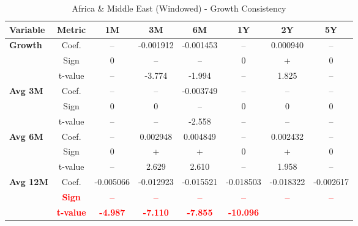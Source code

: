 \documentclass[11pt,english,a4paper,hidelinks]{book}
\begin{document}
\begin{table}[H]
    \centering
    \caption{Africa \& Middle East (Windowed) - Growth Consistency}
    \begin{tabular}{lccccccc}
        \toprule
        \textbf{Variable} & \textbf{Metric} & \textbf{1M} & \textbf{3M} & \textbf{6M} & \textbf{1Y} & \textbf{2Y} & \textbf{5Y} \\
        \midrule
        \multirow{3}{*}{\textbf{Growth}}
            & Coef.    & --        & -0.001912 & -0.001453 & --        & 0.000940  & --        \\
            & Sign     & 0         & –         & –         & 0         & +         & 0         \\
            & t-value  & --        & -3.774    & -1.994    & --        & 1.825     & --        \\
        \cmidrule{1-8}
        \multirow{3}{*}{\textbf{Avg 3M}}
            & Coef.    & --        & --        & -0.003749 & --        & --        & --        \\
            & Sign     & 0         & 0         & –         & 0         & 0         & 0         \\
            & t-value  & --        & --        & -2.558    & --        & --        & --        \\
        \cmidrule{1-8}
        \multirow{3}{*}{\textbf{Avg 6M}}
            & Coef.    & --        & 0.002948  & 0.004849  & --        & 0.002432  & --        \\
            & Sign     & 0         & +         & +         & 0         & +         & 0         \\
            & t-value  & --        & 2.629     & 2.610     & --        & 1.958     & --        \\
        \cmidrule{1-8}
        \multirow{3}{*}{\textbf{Avg 12M}}
            & Coef.    & -0.005066 & -0.012923 & -0.015521 & -0.018503 & -0.018322 & -0.002617 \\
            & \textbf{\textcolor{red}{Sign}}
            & \textbf{\textcolor{red}{–}}
            & \textbf{\textcolor{red}{–}}
            & \textbf{\textcolor{red}{–}}
            & \textbf{\textcolor{red}{–}}
            & \textbf{\textcolor{red}{–}}
            & \textbf{\textcolor{red}{–}} \\
            & \textbf{\textcolor{red}{t-value}}
            & \textbf{\textcolor{red}{-4.987}}
            & \textbf{\textcolor{red}{-7.110}}
            & \textbf{\textcolor{red}{-7.855}}
            & \textbf{\textcolor{red}{-10.096}}

\end{tabular}
\end{table}
\end{document}
